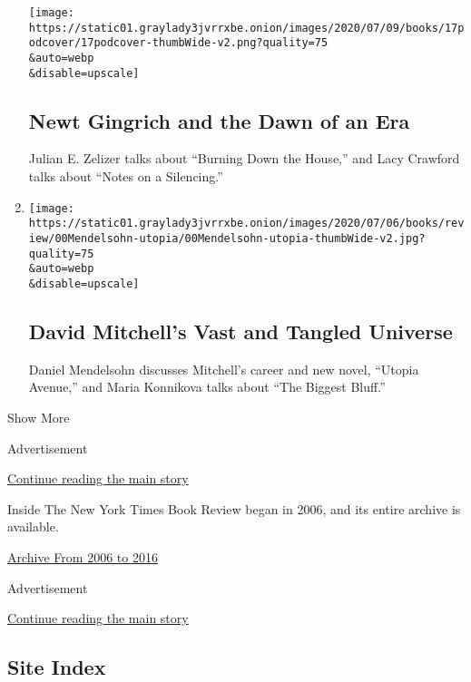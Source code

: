 \begin{enumerate}
  \texttt{[image: https://static01.graylady3jvrrxbe.onion/images/2020/07/09/books/17podcover/17podcover-thumbWide-v2.png?quality=75\\\&auto=webp\\\&disable=upscale]}

  \hypertarget{newt-gingrich-and-the-dawn-of-an-era}{%
  \subsection{Newt Gingrich and the Dawn of an
  Era}\label{newt-gingrich-and-the-dawn-of-an-era}}

  Julian E. Zelizer talks about ``Burning Down the House,'' and Lacy
  Crawford talks about ``Notes on a Silencing.''
\item
  \href{/2020/07/10/books/review/david-mitchell-utopia-avenue-daniel-mendelsohn-biggest-bluff-poker-maria-konnikova.html}{}

  \texttt{[image: https://static01.graylady3jvrrxbe.onion/images/2020/07/06/books/review/00Mendelsohn-utopia/00Mendelsohn-utopia-thumbWide-v2.jpg?quality=75\\\&auto=webp\\\&disable=upscale]}

  \hypertarget{david-mitchells-vast-and-tangled-universe}{%
  \subsection{David Mitchell's Vast and Tangled
  Universe}\label{david-mitchells-vast-and-tangled-universe}}

  Daniel Mendelsohn discusses Mitchell's career and new novel, ``Utopia
  Avenue,'' and Maria Konnikova talks about ``The Biggest Bluff.''
\end{enumerate}

Show More

Advertisement

\protect\hyperlink{after-mid1}{Continue reading the main story}

Inside The New York Times Book Review began in 2006, and its entire
archive is available.

\href{http://www.nytimes3xbfgragh.onion/ref/books/books-podcast-archive.html}{Archive
From 2006 to 2016}

Advertisement

\protect\hyperlink{after-mktg}{Continue reading the main story}

\hypertarget{site-index}{%
\subsection{Site Index}\label{site-index}}

